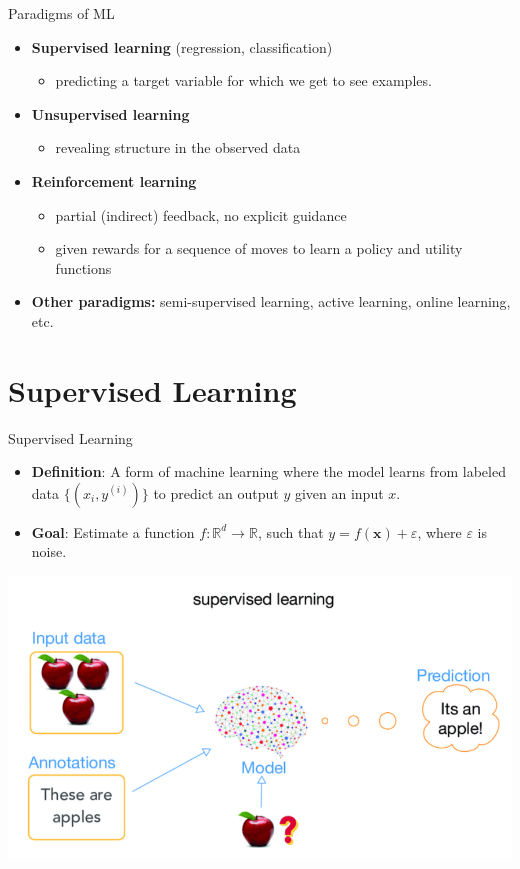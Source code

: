 \documentclass[serif, aspectratio=169]{beamer}
\begin{document}
\begin{frame}{Paradigms of ML}

\begin{minipage}{1.0\textwidth}
    \begin{itemize}
        \item \textbf{Supervised learning} (regression, classification)
        \begin{itemize}
            \item predicting a target variable for which we get to see examples.
        \end{itemize}
        \item \textbf{Unsupervised learning}
        \begin{itemize}
            \item revealing structure in the observed data
        \end{itemize}
        \item \textbf{Reinforcement learning}
        \begin{itemize}
            \item partial (indirect) feedback, no explicit guidance
            \item given rewards for a sequence of moves to learn a policy and utility functions
        \end{itemize}
        \item \textbf{Other paradigms:} semi-supervised learning, active learning, online learning, etc.
    \end{itemize}
\end{minipage}%
\end{frame}




\section{Supervised Learning}
\begin{frame}{Supervised Learning}
    \begin{itemize}
        \item \textbf{Definition}: A form of machine learning where the model learns from labeled data \( \{(x_i, y^{(i)})\} \) to predict an output \( y \) given an input \( x \).
        \item \textbf{Goal}: Estimate a function \( f: \mathbb{R}^d \rightarrow \mathbb{R} \), such that \( y = f(\mathbf{x}) + \varepsilon \), where \( \varepsilon \) is noise.
    \end{itemize}
     \begin{center}
        \includegraphics[width=0.6\linewidth]{pic/supervised.png}
    \end{center}
\end{frame}
\end{document}
